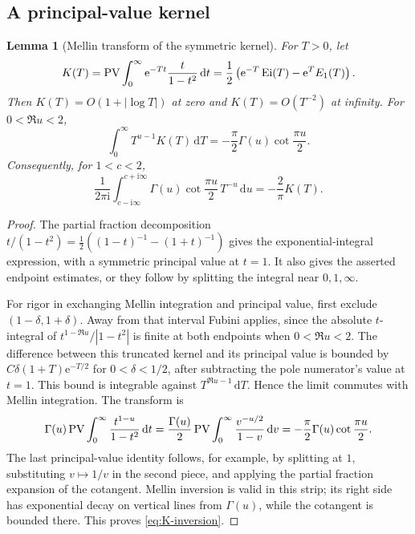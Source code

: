\documentclass[11pt,a4paper]{article}
\numberwithin{equation}{section}
\newtheorem{lemma}[theorem]{Lemma}
\theoremstyle{definition}
\theoremstyle{remark}\newtheorem{remark}[theorem]{Remark}
\newcommand{\ii}{\mathrm i}\newcommand{\e}{\mathrm e}
\newcommand{\dd}{\,\mathrm d}\newcommand{\id}{\operatorname{id}}
\begin{document}
\subsection{A principal-value kernel}
\begin{lemma}[Mellin transform of the symmetric kernel]\label{lem:K}
For $T>0$, let
\begin{equation}\label{eq:K}
 K(T)=\PV\int_0^\infty\e^{-Tt}\frac{t}{1-t^2}\dd t
 =\frac12\left(\e^{-T}\operatorname{Ei}(T)
                         -\e^T E_1(T)\right).
\end{equation}
Then $K(T)=O(1+|\log T|)$ at zero and $K(T)=O(T^{-2})$ at infinity.
For $0<\Re u<2$,
\begin{equation}\label{eq:K-Mellin}
 \int_0^\infty T^{u-1}K(T)\dd T
       =-\frac\pi2\Gamma(u)\cot\frac{\pi u}{2}.
\end{equation}
Consequently, for $1<c<2$,
\begin{equation}\label{eq:K-inversion}
 \frac1{2\pi\ii}\int_{c-\ii\infty}^{c+\ii\infty}
 \Gamma(u)\cot\frac{\pi u}{2}\,T^{-u}\dd u
       =-\frac2\pi K(T).
\end{equation}
\end{lemma}
\begin{proof}
The partial fraction decomposition
$t/(1-t^2)=\frac12((1-t)^{-1}-(1+t)^{-1})$
gives the exponential-integral expression, with a symmetric principal
value at $t=1$. It also gives the asserted endpoint estimates, or they
follow by splitting the integral near $0,1,\infty$.

For rigor in exchanging Mellin integration and principal value, first
exclude $(1-\delta,1+\delta)$. Away from that interval Fubini applies,
since the absolute $t$-integral of
$t^{1-\Re u}/|1-t^2|$ is finite at both endpoints when
$0<\Re u<2$. The difference between this truncated kernel and its
principal value is bounded by
$C\delta(1+T)\e^{-T/2}$ for $0<\delta<1/2$, after subtracting the
pole numerator's value at $t=1$. This bound is integrable against
$T^{\Re u-1}\dd T$. Hence the limit commutes with Mellin integration.
The transform is
\[
 \Gamma(u)\PV\int_0^\infty\frac{t^{1-u}}{1-t^2}\dd t
 =\frac{\Gamma(u)}2\PV\int_0^\infty\frac{v^{-u/2}}{1-v}\dd v
 =-\frac\pi2\Gamma(u)\cot\frac{\pi u}{2}.
\]
The last principal-value identity follows, for example, by splitting at
$1$, substituting $v\mapsto1/v$ in the second piece, and applying the
partial fraction expansion of the cotangent. Mellin inversion is valid
in this strip; its right side has exponential decay on vertical lines
from $\Gamma(u)$, while the cotangent is bounded there. This proves
\eqref{eq:K-inversion}.
\end{proof}
\end{document}
